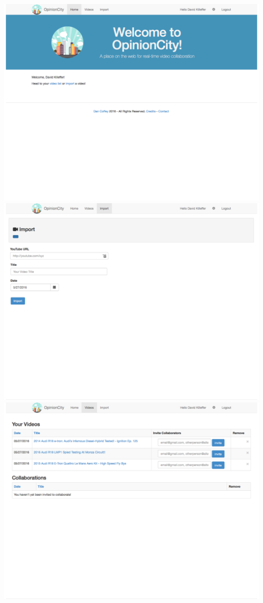 \begin{enumerate}
{\centering\includegraphics[width=1\textwidth]{gfx/opinion-city/homepage1.pdf}} \\
{\centering\includegraphics[width=1\textwidth]{gfx/opinion-city/import1.pdf}} \\
{\centering\includegraphics[width=1\textwidth]{gfx/opinion-city/videolist1.pdf}} \\

\end{enumerate}
